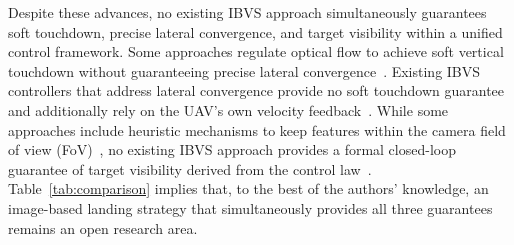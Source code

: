 \documentclass{IEEEtaes}
\begin{document}
Despite these advances, no existing IBVS approach simultaneously guarantees soft touchdown, precise lateral convergence, and target visibility within a unified control framework. Some approaches regulate optical flow to achieve soft vertical touchdown without guaranteeing precise lateral convergence~\cite{herisse2012,ho2018}. Existing IBVS controllers that address lateral convergence provide no soft touchdown guarantee and additionally rely on the UAV's own velocity feedback~\cite{lin2023,cho2022}. While some approaches include heuristic mechanisms to keep features within the camera field of view (FoV)~\cite{cho2022,angelis2026}, no existing IBVS approach provides a formal closed-loop guarantee of target visibility derived from the control law~\cite{lin2023,cho2022,herisse2012,ho2018}. Table~\ref{tab:comparison} implies that, to the best of the authors' knowledge, an image-based landing strategy that simultaneously provides all three guarantees remains an open research area.
\end{document}
